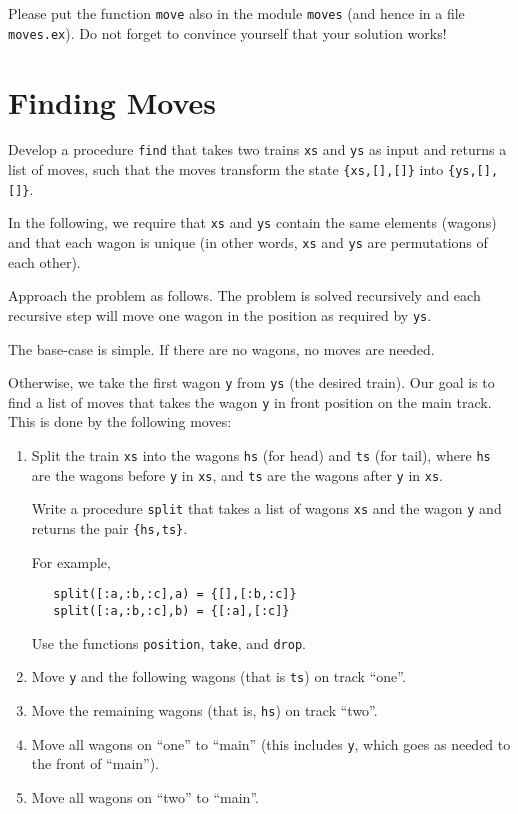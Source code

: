 \documentclass[a4paper,11pt]{article}
\begin{document}
Please put the function \verb+move+ also in the module \verb+moves+
(and hence in a file \verb+moves.ex+).  Do not forget to convince
yourself that your solution works!


\section{Finding Moves}

Develop a procedure \verb+find+ that takes two trains \verb+xs+
and \verb+ys+ as input and returns a list of moves, such that the
moves transform the state \verb+{xs,[],[]}+ into
\verb+{ys,[],[]}+.

In the following, we require that \verb+xs+ and \verb+ys+ contain the
same elements (wagons) and that each wagon is unique (in other
words, \verb+xs+ and \verb+ys+ are permutations of each other).

Approach the problem as follows. The problem is solved
recursively and each recursive step will move one wagon in the
position as required by \verb+ys+.

The base-case is simple. If there are no wagons, no moves are
needed.

Otherwise, we take the first wagon \verb+y+ from \verb+ys+ (the
desired train). Our goal is to find a list of moves that takes
the wagon \verb+y+ in front position on the main track. This is
done by the following moves:
\begin{enumerate}
  
\item Split the train \verb+xs+ into the wagons \verb+hs+ (for head) and
  \verb+ts+ (for tail), where \verb+hs+ are the wagons before \verb+y+
  in \verb+xs+, and \verb+ts+ are the wagons after \verb+y+ in \verb+xs+.

  Write a procedure \verb+split+ that takes a list of wagons
  \verb+xs+ and the wagon \verb+y+ and returns the pair \verb+{hs,ts}+.

  For example, 
\begin{verbatim}
   split([:a,:b,:c],a) = {[],[:b,:c]}
   split([:a,:b,:c],b) = {[:a],[:c]}
\end{verbatim}
  
  Use the functions \verb+position+, \verb+take+, and \verb+drop+.

\item Move \verb+y+ and the following wagons (that is \verb+ts+) on track
  ``one''.
  
\item Move the remaining wagons (that is, \verb+hs+) on track
  ``two''.
  
\item Move all wagons on ``one'' to ``main'' (this includes \verb+y+,
  which goes as needed to the front of ``main'').
  
\item Move all wagons on ``two'' to ``main''.
\end{enumerate}
\end{document}
